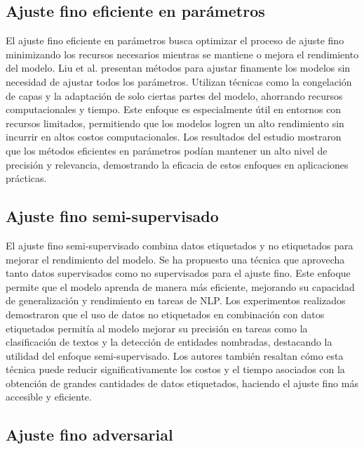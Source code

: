 \subsection{Ajuste fino eficiente en parámetros}

El ajuste fino eficiente en parámetros busca optimizar el proceso de ajuste fino minimizando los recursos necesarios mientras se mantiene o mejora el rendimiento del modelo. Liu et al. \cite{Liu2023} presentan métodos para ajustar finamente los modelos sin necesidad de ajustar todos los parámetros. Utilizan técnicas como la congelación de capas y la adaptación de solo ciertas partes del modelo, ahorrando recursos computacionales y tiempo. Este enfoque es especialmente útil en entornos con recursos limitados, permitiendo que los modelos logren un alto rendimiento sin incurrir en altos costos computacionales. Los resultados del estudio mostraron que los métodos eficientes en parámetros podían mantener un alto nivel de precisión y relevancia, demostrando la eficacia de estos enfoques en aplicaciones prácticas.

\subsection{Ajuste fino semi-supervisado}

El ajuste fino semi-supervisado combina datos etiquetados y no etiquetados para mejorar el rendimiento del modelo. Se ha propuesto una técnica \cite{Su2021} que aprovecha tanto datos supervisados como no supervisados para el ajuste fino. Este enfoque permite que el modelo aprenda de manera más eficiente, mejorando su capacidad de generalización y rendimiento en tareas de NLP. Los experimentos realizados demostraron que el uso de datos no etiquetados en combinación con datos etiquetados permitía al modelo mejorar su precisión en tareas como la clasificación de textos y la detección de entidades nombradas, destacando la utilidad del enfoque semi-supervisado. Los autores también resaltan cómo esta técnica puede reducir significativamente los costos y el tiempo asociados con la obtención de grandes cantidades de datos etiquetados, haciendo el ajuste fino más accesible y eficiente.

\subsection{Ajuste fino adversarial}

